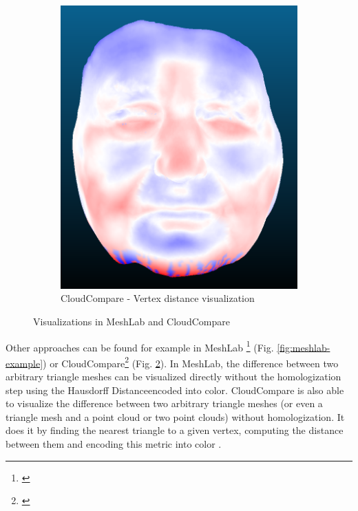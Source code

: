 \begin{figure}[h]
\begin{subfigure}{0.3\textwidth}
	\includegraphics[width=\textwidth]{./img/cloudcompare-example01.PNG}
    \caption[CloudCompare - Vertex distance visualization]{CloudCompare - Vertex distance visualization}
    \label{fig:cloudcompare-example}
	\end{subfigure}
\caption{Visualizations in MeshLab and CloudCompare}
\end{figure}

Other approaches can be found for example in MeshLab \footnote{\citet{MeshLab}} (Fig. \ref{fig:meshlab-example}) or CloudCompare\footnote{\citet{CloudCmp}} (Fig. \ref{fig:cloudcompare-example}). In MeshLab, the difference between two arbitrary triangle meshes can be visualized directly without the homologization step using the Hausdorff Distance\footnotemark encoded into color. CloudCompare is also able to visualize the difference between two arbitrary triangle meshes (or even a triangle mesh and a point cloud or two point clouds) without homologization. It does it by finding the nearest triangle to a given vertex, computing the distance between them and encoding this metric into color \citep{CloudCmpDistance}.

